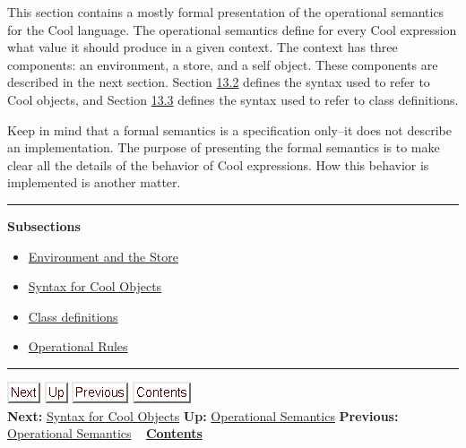 \documentclass[]{article}
\begin{document}
This section contains a mostly formal presentation of the operational
semantics for the Cool language. The operational semantics define for
every Cool expression what value it should produce in a given context.
The context has three components: an environment, a store, and a self
object. These components are described in the next section. Section
\href{node46.html\#objectsyntax}{13.2} defines the syntax used to refer
to Cool objects, and Section \href{node47.html\#classdefs}{13.3} defines
the syntax used to refer to class definitions.

Keep in mind that a formal semantics is a specification only--it does
not describe an implementation. The purpose of presenting the formal
semantics is to make clear all the details of the behavior of Cool
expressions. How this behavior is implemented is another matter.

\begin{center}\rule{3in}{0.4pt}\end{center}

\textbf{Subsections}

\begin{itemize}
\itemsep1pt\parskip0pt
\item
  \href{node45.html}{Environment and the Store}
\item
  \href{node46.html}{Syntax for Cool Objects}
\item
  \href{node47.html}{Class definitions}
\item
  \href{node48.html}{Operational Rules}
\end{itemize}

\begin{center}\rule{3in}{0.4pt}\end{center}

\href{node46.html}{\includegraphics{next.png}}
\href{node44.html}{\includegraphics{up.png}}
\href{node44.html}{\includegraphics{prev.png}}
\href{node1.html}{\includegraphics{contents.png}} \\ \textbf{Next:}
\href{node46.html}{Syntax for Cool Objects} \textbf{Up:}
\href{node44.html}{Operational Semantics} \textbf{Previous:}
\href{node44.html}{Operational Semantics} ~
\textbf{\href{node1.html}{Contents}} \\ \\
\end{document}
